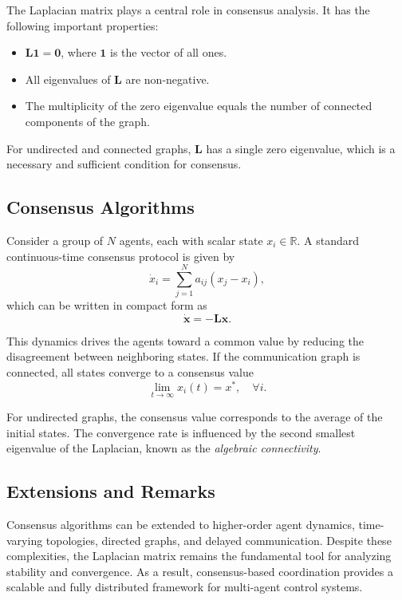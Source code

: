 The Laplacian matrix plays a central role in consensus analysis.
It has the following important properties:
\begin{itemize}
    \item $\mathbf{L}\mathbf{1} = \mathbf{0}$, where $\mathbf{1}$ is the vector of all ones.
    \item All eigenvalues of $\mathbf{L}$ are non-negative.
    \item The multiplicity of the zero eigenvalue equals the number of connected components of the graph.
\end{itemize}

For undirected and connected graphs, $\mathbf{L}$ has a single zero eigenvalue, which is a necessary and sufficient condition for consensus.

\subsection{Consensus Algorithms}

Consider a group of $N$ agents, each with scalar state $x_i \in \mathbb{R}$.
A standard continuous-time consensus protocol is given by
\begin{equation}
    \dot{x}_i = \sum_{j=1}^{N} a_{ij} (x_j - x_i),
\end{equation}
which can be written in compact form as
\begin{equation}
    \dot{\mathbf{x}} = -\mathbf{L}\mathbf{x}.
\end{equation}

This dynamics drives the agents toward a common value by reducing the disagreement between neighboring states.
If the communication graph is connected, all states converge to a consensus value
\begin{equation}
    \lim_{t \to \infty} x_i(t) = x^\ast, \quad \forall i.
\end{equation}

For undirected graphs, the consensus value corresponds to the average of the initial states.
The convergence rate is influenced by the second smallest eigenvalue of the Laplacian, known as the \textit{algebraic connectivity}.

\subsection{Extensions and Remarks}

Consensus algorithms can be extended to higher-order agent dynamics, time-varying topologies, directed graphs, and delayed communication.
Despite these complexities, the Laplacian matrix remains the fundamental tool for analyzing stability and convergence.
As a result, consensus-based coordination provides a scalable and fully distributed framework for multi-agent control systems.

